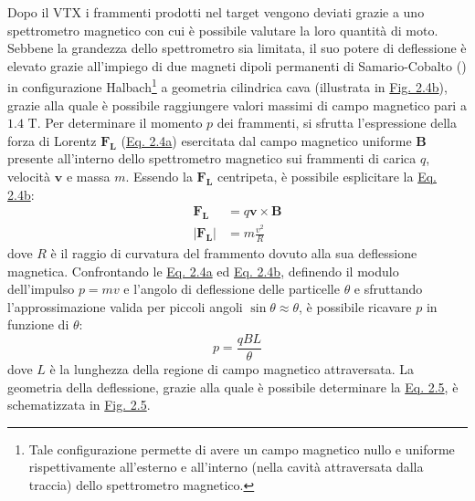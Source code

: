 \documentclass[12pt,a4paper,twoside]{report}
\newcommand{\vect}[1]{\boldsymbol{#1}}
\begin{document}
	Dopo il VTX i frammenti prodotti nel target vengono deviati grazie a uno spettrometro magnetico con cui è possibile valutare la loro quantità di moto. Sebbene la grandezza dello spettrometro sia limitata, il suo potere di deflessione è elevato grazie all'impiego di due magneti dipoli permanenti di Samario-Cobalto () in configurazione Halbach\footnote{Tale configurazione permette di avere un campo magnetico nullo e uniforme rispettivamente all'esterno e all'interno (nella cavità attraversata dalla traccia) dello spettrometro magnetico.} a geometria cilindrica cava (illustrata in \hyperref[fig:magnetic_spectrometer]{Fig. 2.4b}), grazie alla quale è possibile raggiungere valori massimi di campo magnetico pari a $1.4\mbox{ T}$. Per determinare il momento $p$ dei frammenti, si sfrutta l'espressione della forza di Lorentz $\vect{F_L}$ (\hyperref[eq:lorentz_force]{Eq. 2.4a}) esercitata dal campo magnetico uniforme $\vect{B}$ presente all'interno dello spettrometro magnetico sui frammenti di carica $q$, velocità $\vect{v}$ e massa $m$. Essendo la $\vect{F_L}$ centripeta, è possibile esplicitare la \hyperref[eq:centripetal_force]{Eq. 2.4b}:
	\begin{subequations}
		\begin{align}
			\label{eq:lorentz_force}
			\vect{F_L}&=q\vect{v}\times\vect{B}\\
			\label{eq:centripetal_force}
			\left|\vect{F_L}\right|&=m\frac{v^2}{R}
		\end{align}
	\end{subequations}
	dove $R$ è il raggio di curvatura del frammento dovuto alla sua deflessione magnetica. Confrontando le \hyperref[eq:lorentz_force]{Eq. 2.4a} ed \hyperref[eq:centripetal_force]{Eq. 2.4b}, definendo il modulo dell'impulso $p=mv$ e l'angolo di deflessione delle particelle $\theta$ e sfruttando l'approssimazione valida per piccoli angoli $\sin{\theta}\approx\theta$, è possibile ricavare $p$ in funzione di $\theta$:
	\begin{equation}
		p=\frac{qBL}{\theta}
		\label{eq:momentum_deflession}
	\end{equation}
	dove $L$ è la lunghezza della regione di campo magnetico attraversata. La geometria della deflessione, grazie alla quale è possibile determinare la \hyperref[eq:momentum_deflession]{Eq. 2.5}, è schematizzata in \hyperref[fig:momentum_deflession]{Fig. 2.5}.
	
\end{document}
